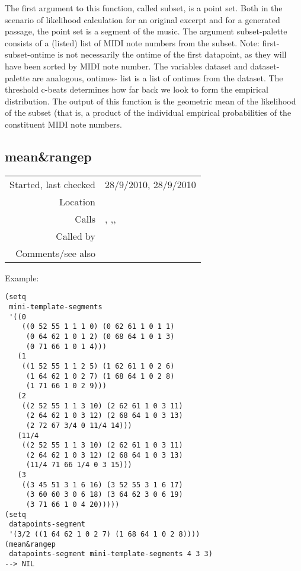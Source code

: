 \noindent The first argument to this function, called
subset, is a point set. Both in the scenario of
likelihood calculation for an original excerpt and
for a generated passage, the point set is a segment
of the music. The argument subset-palette consists of
a (listed) list of MIDI note numbers from the subset.
Note: first-subset-ontime is not necessarily
the ontime of the first datapoint, as they will have
been sorted by MIDI note number. The variables
dataset and dataset-palette are analogous, ontimes-
list is a list of ontimes from the dataset. The
threshold c-beats determines how far back we look to
form the empirical distribution. The output of this
function is the geometric mean of the likelihood of
the subset (that is, a product of the individual
empirical probabilities of the constituent MIDI note
numbers.


\subsection*{mean\&rangep}\label{fun:mean-and-rangep}

\vspace{0.3cm}
\begin{tabular}{r|p{8cm}}
Started, last checked & 28/9/2010, 28/9/2010 \\
Location & \nameref{sec:generating-beat-MNN-spacing-forwards} \\
Calls & \nameref{fun:full-segment-nearest<ontime}, \nameref{fun:max-item},\newline \nameref{fun:min-item}, \nameref{fun:nth-list-of-lists} \\
Called by & \nameref{fun:checklistp} \\
Comments/see also & 
\end{tabular}

\vspace{0.5cm}
\noindent Example:
\begin{verbatim}
(setq
 mini-template-segments
 '((0
    ((0 52 55 1 1 1 0) (0 62 61 1 0 1 1)
     (0 64 62 1 0 1 2) (0 68 64 1 0 1 3)
     (0 71 66 1 0 1 4)))
   (1
    ((1 52 55 1 1 2 5) (1 62 61 1 0 2 6)
     (1 64 62 1 0 2 7) (1 68 64 1 0 2 8)
     (1 71 66 1 0 2 9)))
   (2
    ((2 52 55 1 1 3 10) (2 62 61 1 0 3 11)
     (2 64 62 1 0 3 12) (2 68 64 1 0 3 13)
     (2 72 67 3/4 0 11/4 14)))
   (11/4
    ((2 52 55 1 1 3 10) (2 62 61 1 0 3 11)
     (2 64 62 1 0 3 12) (2 68 64 1 0 3 13)
     (11/4 71 66 1/4 0 3 15)))
   (3
    ((3 45 51 3 1 6 16) (3 52 55 3 1 6 17)
     (3 60 60 3 0 6 18) (3 64 62 3 0 6 19)
     (3 71 66 1 0 4 20)))))
(setq
 datapoints-segment
 '(3/2 ((1 64 62 1 0 2 7) (1 68 64 1 0 2 8))))
(mean&rangep
 datapoints-segment mini-template-segments 4 3 3)
--> NIL
\end{verbatim}

